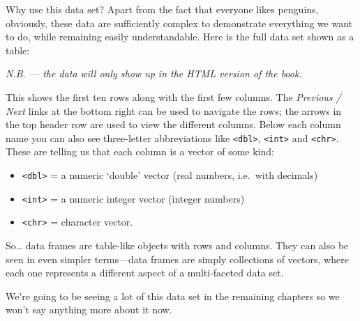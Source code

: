 \documentclass[
]{book}
\begin{document}
Why use this data set? Apart from the fact that everyone likes penguins, obviously, these data are sufficiently complex to demonstrate everything we want to do, while remaining easily understandable. Here is the full data set shown as a table:

\emph{N.B. --- the data will only show up in the HTML version of the book.}

This shows the first ten rows along with the first few columns. The \emph{Previous / Next} links at the bottom right can be used to navigate the rows; the arrows in the top header row are used to view the different columns. Below each column name you can also see three-letter abbreviations like \texttt{\textless{}dbl\textgreater{}}, \texttt{\textless{}int\textgreater{}} and \texttt{\textless{}chr\textgreater{}}. These are telling us that each column is a vector of some kind:

\begin{itemize}
\item
  \texttt{\textless{}dbl\textgreater{}} = a numeric `double' vector (real numbers, i.e.~with decimals)
\item
  \texttt{\textless{}int\textgreater{}} = a numeric integer vector (integer numbers)
\item
  \texttt{\textless{}chr\textgreater{}} = character vector.
\end{itemize}

So\ldots{} data frames are table-like objects with rows and columns. They can also be seen in even simpler terms---data frames are simply collections of vectors, where each one represents a different aspect of a multi-faceted data set.

We're going to be seeing a lot of this data set in the remaining chapters so we won't say anything more about it now.
\end{document}
